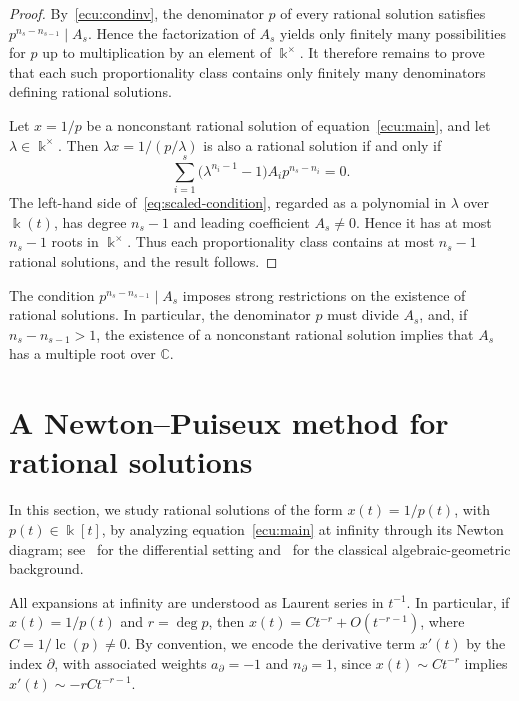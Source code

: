 \documentclass[12pt,a4paper]{amsart}
\numberwithin{theorem}{section}
\theoremstyle{definition}
\begin{document}
	\begin{proof}
		By~\eqref{ecu:condinv}, the denominator $p$ of every rational solution satisfies $p^{n_s-n_{s-1}}\mid A_s$. Hence the factorization of $A_s$ yields only finitely many possibilities for $p$ up to multiplication by an element of $\Bbbk^\times$. It therefore remains to prove that each such proportionality class contains only finitely many denominators defining rational solutions.
		
		Let $x=1/p$ be a nonconstant rational solution of equation~\eqref{ecu:main}, and let $\lambda\in\Bbbk^\times$. Then $\lambda x=1/(p/\lambda)$ is also a rational solution if and only if
		\begin{equation}\label{eq:scaled-condition}
			\sum_{i=1}^s\bigl(\lambda^{n_i-1}-1\bigr)A_i p^{n_s-n_i}=0.
		\end{equation}
		The left-hand side of~\eqref{eq:scaled-condition}, regarded as a polynomial in $\lambda$ over $\Bbbk(t)$, has degree $n_s-1$ and leading coefficient $A_s\neq0$. Hence it has at most $n_s-1$ roots in $\Bbbk^\times$. Thus each proportionality class contains at most $n_s-1$ rational solutions, and the result follows.
	\end{proof}
	
	The condition $p^{n_s-n_{s-1}}\mid A_s$ imposes strong restrictions on the existence of rational solutions. In particular, the denominator $p$ must divide $A_s$, and, if $n_s-n_{s-1}>1$, the existence of a nonconstant rational solution implies that $A_s$ has a multiple root over $\mathbb{C}$.
	
	\section{A Newton--Puiseux method for rational solutions}\label{Sect:3}
	
	In this section, we study rational solutions of the form $x(t)=1/p(t)$, with $p(t)\in\Bbbk[t]$, by analyzing equation~\eqref{ecu:main} at infinity through its Newton diagram; see~\cite{Cano2005NewtonPolygon,Demina2021InvariantCurves} for the differential setting and~\cite{Walker1950} for the classical algebraic-geometric background.
	
	All expansions at infinity are understood as Laurent series in $t^{-1}$. In particular, if $x(t)=1/p(t)$ and $r=\deg p$, then $x(t)=Ct^{-r}+O(t^{-r-1})$, where $C=1/\operatorname{lc}(p)\neq0$. By convention, we encode the derivative term $x'(t)$ by the index $\partial$, with associated weights $a_\partial=-1$ and $n_\partial=1$, since $x(t)\sim Ct^{-r}$ implies $x'(t)\sim-rCt^{-r-1}$.
	
\end{document}
